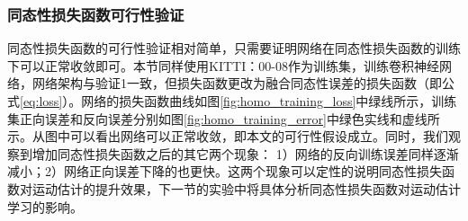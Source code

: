 \subsubsection{同态性损失函数可行性验证}
同态性损失函数的可行性验证相对简单，只需要证明网络在同态性损失函数的训练下可以正常收敛即可。本节同样使用KITTI：00-08作为训练集，训练卷积神经网络，网络架构与验证1一致，但损失函数更改为融合同态性误差的损失函数（即公式\eqref{eq:loss}）。网络的损失函数曲线如图\ref{fig:homo_training_loss}中绿线所示，训练集正向误差和反向误差分别如图\ref{fig:homo_training_error}中绿色实线和虚线所示。从图中可以看出网络可以正常收敛，即本文的可行性假设成立。同时，我们观察到增加同态性损失函数之后的其它两个现象：
1）网络的反向训练误差同样逐渐减小；2）网络正向误差下降的也更快。这两个现象可以定性的说明同态性损失函数对运动估计的提升效果，下一节的实验中将具体分析同态性损失函数对运动估计学习的影响。



